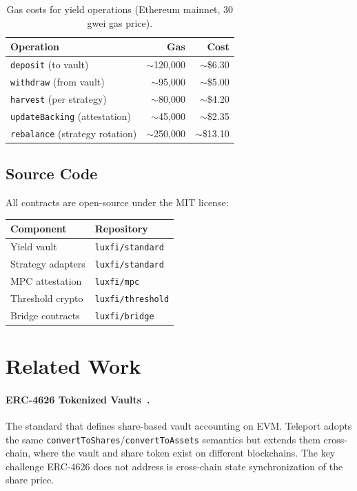 \documentclass[11pt,twocolumn]{article}
\begin{document}
\begin{table}[ht]
\centering
\small
\caption{Gas costs for yield operations (Ethereum mainnet, 30 gwei gas price).}
\label{tab:gas_yield}
\begin{tabular}{@{}lrr@{}}
\toprule
\textbf{Operation} & \textbf{Gas} & \textbf{Cost} \\
\midrule
\texttt{deposit} (to vault) & $\sim$120,000 & $\sim$\$6.30 \\
\texttt{withdraw} (from vault) & $\sim$95,000 & $\sim$\$5.00 \\
\texttt{harvest} (per strategy) & $\sim$80,000 & $\sim$\$4.20 \\
\texttt{updateBacking} (attestation) & $\sim$45,000 & $\sim$\$2.35 \\
\texttt{rebalance} (strategy rotation) & $\sim$250,000 & $\sim$\$13.10 \\
\bottomrule
\end{tabular}
\end{table}

\subsection{Source Code}

All contracts are open-source under the MIT license:

\begin{table}[ht]
\centering
\small
\begin{tabular}{@{}ll@{}}
\toprule
\textbf{Component} & \textbf{Repository} \\
\midrule
Yield vault & \texttt{luxfi/standard} \\
Strategy adapters & \texttt{luxfi/standard} \\
MPC attestation & \texttt{luxfi/mpc} \\
Threshold crypto & \texttt{luxfi/threshold} \\
Bridge contracts & \texttt{luxfi/bridge} \\
\bottomrule
\end{tabular}
\end{table}

\section{Related Work}\label{sec:related}

\paragraph{ERC-4626 Tokenized Vaults~\cite{erc4626}.} The standard that defines share-based vault accounting on EVM. Teleport adopts the same \texttt{convertToShares}/\texttt{convertToAssets} semantics but extends them cross-chain, where the vault and share token exist on different blockchains. The key challenge ERC-4626 does not address is cross-chain state synchronization of the share price.
\end{document}
